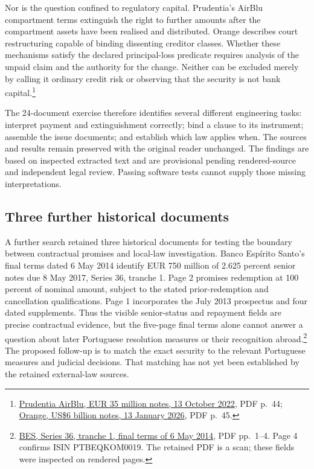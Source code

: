 Nor is the question confined to regulatory capital. Prudentia's AirBlu
compartment terms extinguish the right to further amounts after the
compartment assets have been realised and distributed. Orange describes
court restructuring capable of binding dissenting creditor classes. Whether
these mechanisms satisfy the declared principal-loss predicate requires
analysis of the unpaid claim and the authority for the change. Neither
can be excluded merely by calling it ordinary credit risk or observing
that the security is not bank capital.\footnote{
\href{../prospectus/difficulty-2026-10-04/pdfs/case-103216017.pdf}
{Prudentia AirBlu, EUR 35 million notes, 13 October 2022}, PDF p.~44;
\href{../prospectus/difficulty-2026-10-04/pdfs/case-105155475.pdf}
{Orange, US\$6 billion notes, 13 January 2026}, PDF p.~45.}

The 24-document exercise therefore identifies several different engineering
tasks: interpret payment and extinguishment correctly; bind a clause to its
instrument; assemble the issue documents; and establish which law applies
when. The sources and results remain preserved with the original reader
unchanged. The findings are based on inspected extracted text and are
provisional pending rendered-source and independent legal review. Passing
software tests cannot supply those missing interpretations.


\subsection{Three further historical documents}

A further search retained three historical documents for testing the boundary
between contractual promises and local-law investigation. Banco Espírito
Santo's final terms dated 6 May 2014 identify EUR 750 million of 2.625 percent
senior notes due 8 May 2017, Series 36, tranche 1. Page 2 promises redemption
at 100 percent of nominal amount, subject to the stated prior-redemption and
cancellation qualifications. Page 1 incorporates the July 2013 prospectus and
four dated supplements. Thus the visible senior-status and repayment fields
are precise contractual evidence, but the five-page final terms alone cannot
answer a question about later Portuguese resolution measures or their
recognition abroad.\footnote{\href{../prospectus/jurisdiction-2026-10-04/sources/jur-bes-2014-ptbeqkom0019/source.pdf}
{BES, Series 36, tranche 1, final terms of 6 May 2014}, PDF pp.~1--4.
Page 4 confirms ISIN PTBEQKOM0019. The retained PDF is a scan; these
fields were inspected on rendered pages.}
The proposed follow-up is to match the exact security to the relevant
Portuguese measures and judicial decisions. That matching has not yet been
established by the retained external-law sources.

